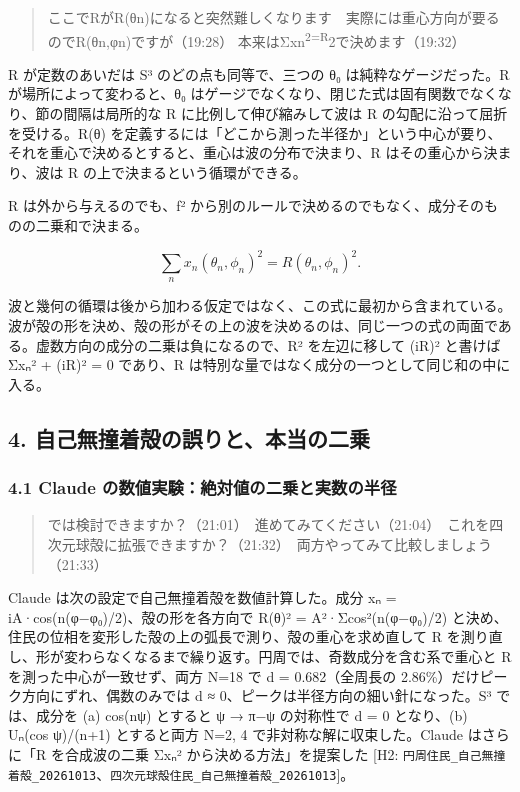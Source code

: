 \documentclass[
  a4paper,
]{ltjsarticle}
\begin{document}
\begin{quote}
ここでRがR(θn)になると突然難しくなります　実際には重心方向が要るのでR(θn,φn)ですが（19:28）
本来はΣxn\textsuperscript{2=R}2で決めます（19:32）
\end{quote}

R が定数のあいだは S³ のどの点も同等で、三つの θ₀
は純粋なゲージだった。R が場所によって変わると、θ₀
はゲージでなくなり、閉じた式は固有関数でなくなり、節の間隔は局所的な R
に比例して伸び縮みして波は R の勾配に沿って屈折を受ける。R(θ)
を定義するには「どこから測った半径か」という中心が要り、それを重心で決めるとすると、重心は波の分布で決まり、R
はその重心から決まり、波は R の上で決まるという循環ができる。

R は外から与えるのでも、\textbar f\textbar²
から別のルールで決めるのでもなく、成分そのものの二乗和で決まる。

\[
\sum_n x_n(\theta_n,\phi_n)^2=R(\theta_n,\phi_n)^2 .
\]

波と幾何の循環は後から加わる仮定ではなく、この式に最初から含まれている。波が殻の形を決め、殻の形がその上の波を決めるのは、同じ一つの式の両面である。虚数方向の成分の二乗は負になるので、R²
を左辺に移して (iR)² と書けば Σxₙ² + (iR)² = 0 であり、R
は特別な量ではなく成分の一つとして同じ和の中に入る。

\subsection{4.
自己無撞着殻の誤りと、本当の二乗}\label{ux81eaux5df1ux7121ux649eux7740ux6bbbux306eux8aa4ux308aux3068ux672cux5f53ux306eux4e8cux4e57}

\subsubsection{4.1 Claude
の数値実験：絶対値の二乗と実数の半径}\label{claude-ux306eux6570ux5024ux5b9fux9a13ux7d76ux5bfeux5024ux306eux4e8cux4e57ux3068ux5b9fux6570ux306eux534aux5f84}

\begin{quote}
では検討できますか？（21:01）　進めてみてください（21:04）　これを四次元球殻に拡張できますか？（21:32）　両方やってみて比較しましょう（21:33）
\end{quote}

Claude は次の設定で自己無撞着殻を数値計算した。成分 xₙ =
iA·cos(n(φ−φ₀)/2)、殻の形を各方向で R(θ)² = A²·Σcos²(n(φ−φ₀)/2)
と決め、住民の位相を変形した殻の上の弧長で測り、殻の重心を求め直して R
を測り直し、形が変わらなくなるまで繰り返す。円周では、奇数成分を含む系で重心と
R を測った中心が一致せず、両方 N=18 で d = 0.682（全周長の
2.86\%）だけピーク方向にずれ、偶数のみでは d ≈
0、ピークは半径方向の細い針になった。S³ では、成分を (a) cos(nψ)
とすると ψ → π−ψ の対称性で d = 0 となり、(b) Uₙ(cos ψ)/(n+1)
とすると両方 N=2, 4 で非対称な解に収束した。Claude はさらに「R
を合成波の二乗 \textbar Σxₙ\textbar² から決める方法」を提案した {[}H2:
\texttt{円周住民\_\allowbreak{}自己無撞着殻\_\allowbreak{}20261013}、\texttt{四次元球殻住民\_\allowbreak{}自己無撞着殻\_\allowbreak{}20261013}{]}。
\end{document}
